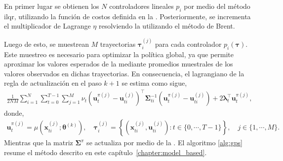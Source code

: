 En primer lugar se obtienen los $N$ controladores lineales $p_i$ por medio del método \acrshort{ilqr}, utilizando la función de costos definida en la . Posteriormente, se incrementa el multiplicador de Lagrange $\eta$ resolviendo la  utilizando el método de Brent.

Luego de esto, se muestrean $M$ trayectorias $\bm\tau_{i}^{(j)}$ para cada controlador $p_{i}(\bm\tau)$. Este muestreo es necesario para optimizar la política global, ya que permite aproximar los valores esperados de la  mediante promedios muestrales de los valores observados en dichas trayectorias. En consecuencia, el lagrangiano de la regla de actualización en el paso $k+1$ se estima como sigue, 
\begin{align}
    \frac{1}{2NM} \sum_{i=1}^{N}\sum_{t=0}^{T-1}\sum_{j=1}^{M} 
    \nu_t \left(\mathbf{u}_t^{\pi (j)} - \mathbf{u}_{ti}^{(j)}\right)^{\top} \bm\Sigma_{ti}^{-1}  \left(\mathbf{u}_t^{\pi (j)} - \mathbf{u}_{ti}^{(j)}\right) + 2 \bm\lambda_t^{\top}\mathbf{u}_t^{\pi(j)},
    \label{eq:policy_theta_sim}
\end{align}
donde, 
\begin{align}
    \mathbf{u}_{t}^{\pi (j)} = \mu\left(\mathbf{x}_{ti}^{(j)}; \bm\theta^{(k)}\right),  \quad \bm\tau_{i}^{(j)} = \left\{\left(\mathbf{x}_{ti}^{(j)}, \mathbf{u}_{ti}^{(j)}\right): t\in \{0, \cdots, T-1\} \right\}, \quad j \in \{1, \cdots, M\}.
\end{align}
Mientras que la matriz $\bm\Sigma^{\pi}$ se actualiza por medio de la . El algoritmo \ref{alg:gps} resume el método descrito en este capítulo~\ref{chapter:model_based}.

